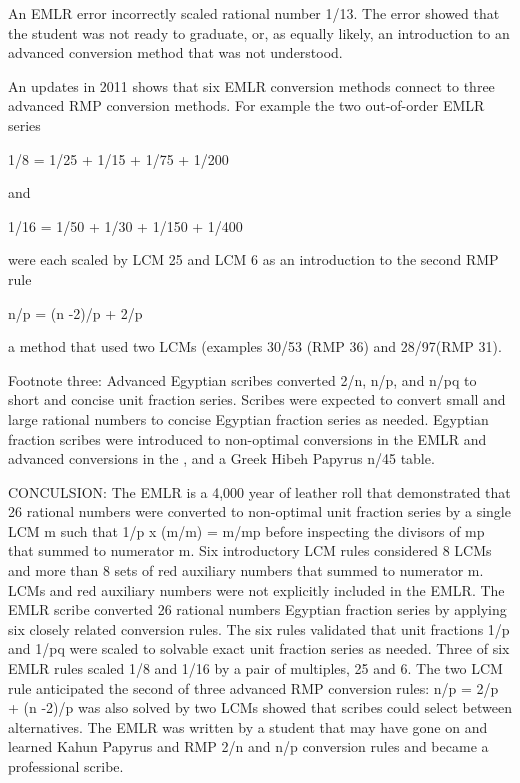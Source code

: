 \documentclass[12pt]{article}
\begin{document}
An EMLR error incorrectly scaled rational number 1/13. The error showed that the student was not ready to graduate, or, as equally likely, an introduction to an advanced conversion method that was not understood. 

An updates in 2011 shows that six EMLR conversion methods connect to three advanced RMP conversion methods. For example the two out-of-order EMLR series 

1/8 = 1/25 + 1/15 + 1/75 + 1/200 

and 

1/16 = 1/50 + 1/30 + 1/150 + 1/400

were each scaled by LCM 25 and LCM 6 as an introduction to the second RMP rule

n/p = (n -2)/p + 2/p

a method that used two LCMs (examples 30/53 (RMP 36) and 28/97(RMP 31).

Footnote three: Advanced Egyptian scribes converted 2/n, n/p, and n/pq to short and concise unit fraction series. Scribes were expected to convert small and large rational numbers to concise Egyptian fraction series as needed. Egyptian fraction scribes were introduced to non-optimal conversions in the EMLR and advanced conversions in the , and a Greek Hibeh Papyrus n/45 table. 

CONCULSION: The EMLR is a 4,000 year of leather roll that demonstrated that 26 rational numbers were converted to non-optimal unit fraction series by a single LCM m such that 1/p x (m/m) = m/mp before inspecting the divisors of mp that summed to numerator m. Six introductory LCM rules considered 8 LCMs and more than 8 sets of red auxiliary numbers that summed to numerator m. LCMs and red auxiliary numbers were not explicitly included in the EMLR. The EMLR scribe converted 26 rational numbers Egyptian fraction series by applying six closely related conversion rules. The six rules validated that unit fractions 1/p and 1/pq were scaled to solvable exact unit fraction series as needed. Three of six EMLR rules scaled 1/8 and 1/16 by a pair of multiples, 25 and 6. The two LCM rule anticipated the second of three advanced RMP conversion rules: n/p = 2/p + (n -2)/p was also solved by two LCMs showed that scribes could select between alternatives. The EMLR was written by a student that may have gone on and learned Kahun Papyrus and RMP 2/n and n/p conversion rules and became a professional scribe.
\end{document}

